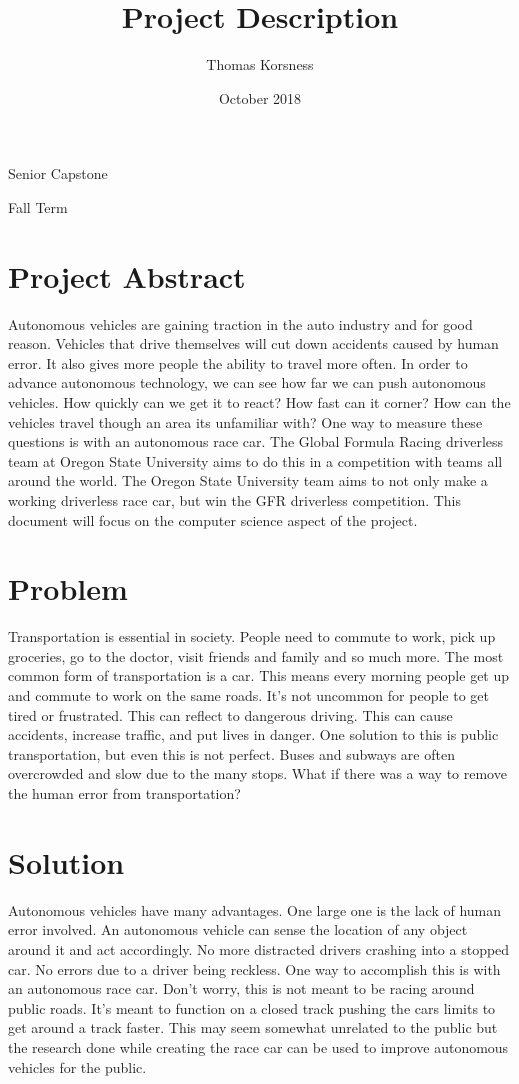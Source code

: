 \documentclass[10pt]{article}
\title{Project Description}
\author{Thomas Korsness }
\date{October 2018}
\begin{document}
\maketitle
\centering Senior Capstone
\linebreak

\centering Fall Term

\raggedright
\section{Project Abstract}
Autonomous vehicles are gaining traction in the auto industry and for good reason. Vehicles that drive themselves will cut down accidents caused by human error. It also gives more people the ability to travel more often. In order to advance autonomous technology, we can see how far we can push autonomous vehicles. How quickly can we get it to react? How fast can it corner? How can the vehicles travel though an area its unfamiliar with? One way to measure these questions is with an autonomous race car. The Global Formula Racing driverless team at Oregon State University aims to do this in a competition with teams all around the world. The Oregon State University team aims to not only make a working driverless race car, but win the GFR driverless competition. This document will focus on the computer science aspect of the project.

\clearpage

\section{Problem}
Transportation is essential in society. People need to commute to work, pick up groceries, go to the doctor, visit friends and family and so much more. The most common form of transportation is a car. This means every morning people get up and commute to work on the same roads. It's not uncommon for people to get tired or frustrated. This can reflect to dangerous driving. This can cause accidents, increase traffic, and put lives in danger. One solution to this is public transportation, but even this is not perfect. Buses and subways are often overcrowded and slow due to the many stops. What if there was a way to remove the human error from transportation?

\section{Solution}
Autonomous vehicles have many advantages. One large one is the lack of human error involved. An autonomous vehicle can sense the location of any object around it and act accordingly. No more distracted drivers crashing into a stopped car. No errors due to a driver being reckless. One way to accomplish this is with an autonomous race car. Don't worry, this is not meant to be racing around public roads. It's meant to function on a closed track pushing the cars limits to get around a track faster. This may seem somewhat unrelated to the public but the research done while creating the race car can be used to improve autonomous vehicles for the public.
\end{document}
